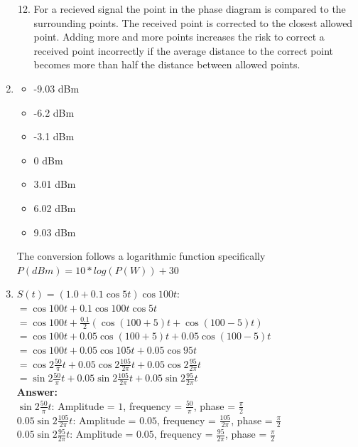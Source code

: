 \documentclass[11pt]{article}
\begin{document}
\begin{enumerate}[label=(\alph*)]
{\begin{enumerate}[label=(\arabic*)]
		\setcounter{enumii}{11}
		\item {
			For a recieved signal the point in the phase diagram is compared to the surrounding points. The received point is
			corrected to the closest allowed point. Adding more and more points increases the risk to correct a received point 
			incorrectly if the average distance to the correct point becomes more than half the distance between allowed points.
		}
	\end{enumerate}
}

\item {
\begin{itemize}
   \item -9.03 dBm
   \item -6.2 dBm
   \item -3.1 dBm
   \item 0 dBm
   \item 3.01 dBm
   \item 6.02 dBm
   \item 9.03 dBm
\end{itemize}

The conversion follows a logarithmic function specifically $P(dBm) = 10 * log(P(W)) + 30$
}

\item {
	$S(t) = (1.0 + 0.1 \cos{5t}) \cos{100t}$: \\
	$= \cos{100t} + 0.1\cos{100t \cos{5t}}$ \\
	$= \cos{100t} + \frac{0.1}{2}(\cos{(100 + 5)t} + \cos{(100 - 5)t})$ \\
	$= \cos{100t} + 0.05\cos{(100 + 5)t} + 0.05\cos{(100-5)t}$ \\
	$= \cos{100t} + 0.05\cos{105t} + 0.05\cos{95t}$ \\
	$= \cos{2\frac{50}{\pi}t} + 0.05\cos{2\frac{105}{2\pi}t} + 0.05\cos{2\frac{95}{2\pi}t}$ \\
	$= \sin{2\frac{50}{\pi}t} + 0.05\sin{2\frac{105}{2\pi}t} + 0.05\sin{2\frac{95}{2\pi}t}$ \\

	\textbf{Answer:} \\
	$\sin{2\frac{50}{\pi}t}$: Amplitude = $1$, frequency = $\frac{50}{\pi}$, phase = $\frac{\pi}{2}$ \\
	$0.05\sin{2\frac{105}{2\pi}t}$: Amplitude = $0.05$, frequency = $\frac{105}{2\pi}$, phase = $\frac{\pi}{2}$ \\
	$0.05\sin{2\frac{95}{2\pi}t}$: Amplitude = $0.05$, frequency = $\frac{95}{2\pi}$, phase = $\frac{\pi}{2}$ \\
}


\end{enumerate}
\end{document}
